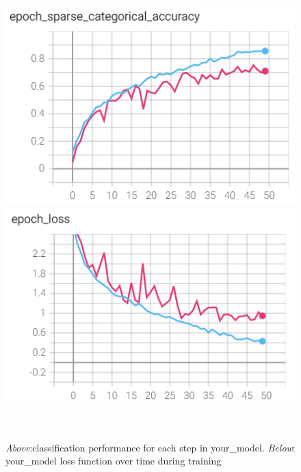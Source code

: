 \begin{figure}
    \centering
    \includegraphics[]{your_model_batch_acc.png}
    \includegraphics[]{your_model_epoch_loss.png}
    \caption{\emph{Above}:classification performance for each step in your\_model. \emph{Below}: your\_model loss function over time during training}\
    \label{fig:your_model_results}
\end{figure}


